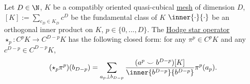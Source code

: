 \begin{proposition}
  Let
    $D \in \N$,
    $K$ be a compatibly oriented quasi-cubical
    \hyperref[cmc:mesh:definition]{mesh} of dimension $D$,
    $[K] := \sum_{c_D \in K_D} c^D$ be the fundamental class of $K$
    $\inner{\cdot}{\cdot}$ be an orthogonal inner product on $K$,
    $p \in \{0, ..., D\}$.
  The \hyperref[cmc/mesh/quasi_cubical/hodge_star/concept-definition]
               {Hodge star operator}
  $\star_p \colon C^p K \to C^{D - p} K$ has the following closed form:
  for any $\pi^p \in C^p K$ and any $c^{D - p} \in C^{D - p} K$,
  \begin{equation}
    (\star_p \pi^p)(b_{D - p})
    = \sum_{a_p \perp b_{D - p}}
      \frac{(a^p \smile b^{D - p})[K]}{\inner{b^{D - p}}{b^{D - p}}} \pi^p(a_p).
  \end{equation}
\end{proposition}
